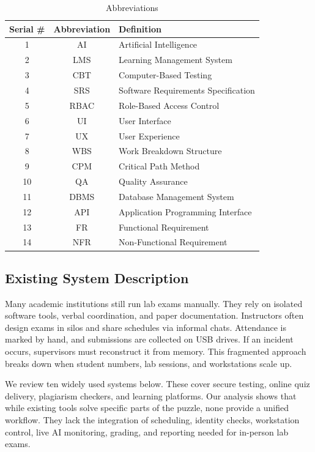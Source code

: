 \begin{table}[!ht]
    \caption{Abbreviations}
    \label{tab:Abbreviations}
    \centering
    \begin{tabular}{ccl} 
        \hline
        \textbf{Serial \#} & \textbf{Abbreviation} & \textbf{Definition} \\
        \hline
        1 & AI & Artificial Intelligence \\
        2 & LMS & Learning Management System \\
        3 & CBT & Computer-Based Testing \\
        4 & SRS & Software Requirements Specification \\
        5 & RBAC & Role-Based Access Control \\
        6 & UI & User Interface \\
        7 & UX & User Experience \\
        8 & WBS & Work Breakdown Structure \\
        9 & CPM & Critical Path Method \\
        10 & QA & Quality Assurance \\
        11 & DBMS & Database Management System \\
        12 & API & Application Programming Interface \\
        13 & FR & Functional Requirement \\
        14 & NFR & Non-Functional Requirement \\
        \hline
    \end{tabular}
\end{table}

\subsection{Existing System Description}

Many academic institutions still run lab exams manually. They rely on isolated software tools, verbal coordination, and paper documentation. Instructors often design exams in silos and share schedules via informal chats. Attendance is marked by hand, and submissions are collected on USB drives. If an incident occurs, supervisors must reconstruct it from memory. This fragmented approach breaks down when student numbers, lab sessions, and workstations scale up.

We review ten widely used systems below. These cover secure testing, online quiz delivery, plagiarism checkers, and learning platforms. Our analysis shows that while existing tools solve specific parts of the puzzle, none provide a unified workflow. They lack the integration of scheduling, identity checks, workstation control, live AI monitoring, grading, and reporting needed for in-person lab exams.

